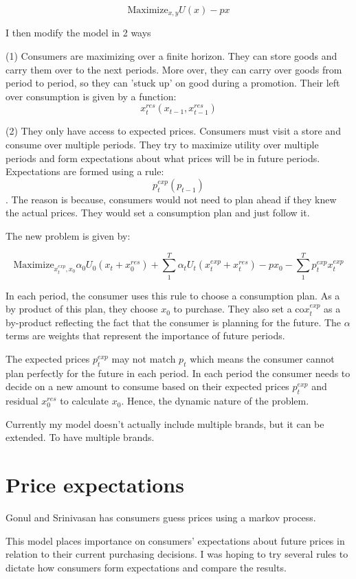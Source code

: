 \documentclass{article}
\begin{document}
$$\text{Maximize}_{x,y} U(x) -px $$

I then modify the model in 2 ways

(1) Consumers are maximizing over a finite horizon. They can store goods and carry them over to the next periods. More over, they can carry over goods from period to period, so they can 'stuck up' on good during a promotion. Their left over consumption is given by a function: $$x^{res}_t(x_{t-1},x^{res}_{t-1})$$

(2) They only have access to expected prices. Consumers must visit a store and consume over multiple periods. They try to maximize utility over multiple periods and form expectations about what prices will be in future periods. Expectations are formed using a rule: $$p^{exp}_t(p_{t-1})$$. The reason is because, consumers would not need to plan ahead if they knew the actual prices. They would set a consumption plan and just follow it.

The new problem is given by:

$$ \text{Maximize}_{x^{exp}_t,x_0} \alpha_0 U_0(x_t +x^{res}_0) + \sum_1^T \alpha_t U_t(x^{exp}_t+x^{res}_{t}) - px_0 - \sum_1^T p^{exp}_t x^{exp}_t $$

In each period, the consumer uses this rule to choose a consumption plan. As a by product of this plan, they choose $x_0$ to purchase. They also set a co$x^{exp}_t$ as a by-product reflecting the fact that the consumer is planning for the future. The $\alpha$ terms are weights that represent the importance of future periods.

The expected prices $p^{exp}_t$ may not match $p_t$ which means the consumer cannot plan perfectly for the future in each period. In each period the consumer needs to decide on a new amount to consume based on their expected prices $p_t^{exp}$  and residual $x^{res}_0$ to calculate $x_0$. Hence, the dynamic nature of the problem.


Currently my model doesn't actually include multiple brands, but it can be extended. To have multiple brands.

\section{Price expectations}

Gonul and Srinivasan has consumers guess prices using a markov process.

This model places importance on consumers' expectations about future prices in relation to their current purchasing decisions. I was hoping to try several rules to dictate how consumers form expectations and compare the results.
\end{document}
